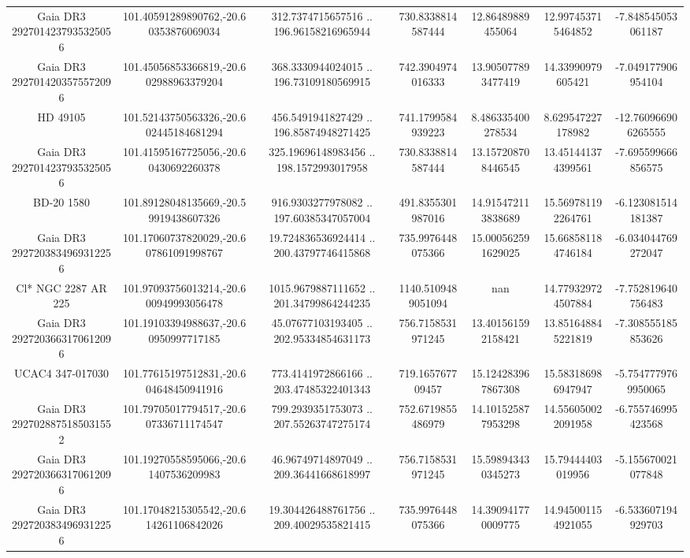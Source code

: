 \begin{table}
\begin{tabular}{ccccccc}
Gaia DR3 2927014237935325056 & 101.40591289890762,-20.60353876069034 & 312.7374715657516 .. 196.96158216965944 & 730.8338814587444 & 12.86489889455064 & 12.997453715464852 & -7.848545053061187 \\
Gaia DR3 2927014203575572096 & 101.45056853366819,-20.602988963379204 & 368.3330944024015 .. 196.73109180569915 & 742.3904974016333 & 13.905077893477419 & 14.33990979605421 & -7.049177906954104 \\
HD  49105 & 101.52143750563326,-20.602445184681294 & 456.5491941827429 .. 196.85874948271425 & 741.1799584939223 & 8.486335400278534 & 8.629547227178982 & -12.760966906265555 \\
Gaia DR3 2927014237935325056 & 101.41595167725056,-20.60430692260378 & 325.19696148983456 .. 198.1572993017958 & 730.8338814587444 & 13.157208708446545 & 13.451441374399561 & -7.695599666856575 \\
BD-20  1580 & 101.89128048135669,-20.59919438607326 & 916.9303277978082 .. 197.60385347057004 & 491.8355301987016 & 14.915472113838689 & 15.569781192264761 & -6.123081514181387 \\
Gaia DR3 2927203834969312256 & 101.17060737820029,-20.607861091998767 & 19.724836536924414 .. 200.43797746415868 & 735.9976448075366 & 15.000562591629025 & 15.668581184746184 & -6.034044769272047 \\
Cl* NGC 2287     AR     225 & 101.97093756013214,-20.600949993056478 & 1015.9679887111652 .. 201.34799864244235 & 1140.5109489051094 & nan & 14.779329724507884 & -7.752819640756483 \\
Gaia DR3 2927203663170612096 & 101.19103394988637,-20.60950997717185 & 45.07677103193405 .. 202.95334854631173 & 756.7158531971245 & 13.401561592158421 & 13.851648845221819 & -7.308555185853626 \\
UCAC4 347-017030 & 101.77615197512831,-20.604648450941916 & 773.4141972866166 .. 203.47485322401343 & 719.165767709457 & 15.124283967867308 & 15.583186986947947 & -5.7547779769950065 \\
Gaia DR3 2927028875185031552 & 101.79705017794517,-20.607336711174547 & 799.2939351753073 .. 207.55263747275174 & 752.6719855486979 & 14.101525877953298 & 14.556050022091958 & -6.755746995423568 \\
Gaia DR3 2927203663170612096 & 101.19270558595066,-20.61407536209983 & 46.96749714897049 .. 209.36441668618997 & 756.7158531971245 & 15.598943430345273 & 15.79444403019956 & -5.155670021077848 \\
Gaia DR3 2927203834969312256 & 101.17048215305542,-20.614261106842026 & 19.304426488761756 .. 209.40029535821415 & 735.9976448075366 & 14.390941770009775 & 14.945001154921055 & -6.533607194929703 \\

\end{tabular}
\end{table}
